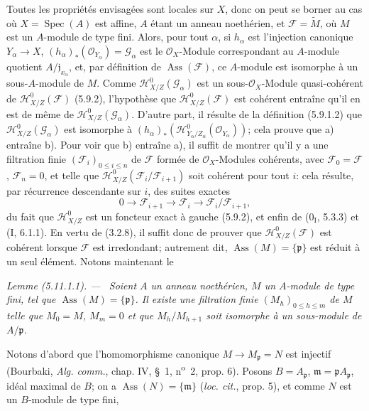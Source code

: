 \documentclass[10pt,oneside]{book}
\newenvironment{lemma}[1][]{%
  \par\medskip\noindent\itshape Lemme (#1). ---\ }{\par}
\begin{document}
Toutes les propriétés envisagées sont locales sur $X$, donc on peut se borner
au cas où $X=\operatorname{Spec}(A)$ est affine, $A$ étant un anneau
noethérien, et $\mathcal F=\widetilde M$, où $M$ est un $A$-module de type
fini. Alors, pour tout $\alpha$, si $h_\alpha$ est l'injection canonique
$Y_\alpha\to X$, $(h_\alpha)_*(\mathcal O_{Y_\alpha})=\mathcal G_\alpha$ est
le $\mathcal O_X$-Module correspondant au $A$-module quotient
$A/\mathfrak j_{x_\alpha}$, et, par définition de
$\operatorname{Ass}(\mathcal F)$, ce $A$-module est isomorphe à un
sous-$A$-module de $M$. Comme $\mathcal H^0_{X/Z}(\mathcal G_\alpha)$ est un
sous-$\mathcal O_X$-Module quasi-cohérent de
$\mathcal H^0_{X/Z}(\mathcal F)$ (5.9.2), l'hypothèse que
$\mathcal H^0_{X/Z}(\mathcal F)$ est cohérent entraîne qu'il en est de même de
$\mathcal H^0_{X/Z}(\mathcal G_\alpha)$. D'autre part, il résulte de la
définition (5.9.1.2) que $\mathcal H^0_{X/Z}(\mathcal G_\alpha)$ est
isomorphe à
$(h_\alpha)_*(\mathcal H^0_{Y_\alpha/Z_\alpha}(\mathcal O_{Y_\alpha}))$;
cela prouve que a) entraîne b). Pour voir que b) entraîne a), il suffit de
montrer qu'il y a une filtration finie $(\mathcal F_i)_{0\leq i\leq n}$ de
$\mathcal F$ formée de $\mathcal O_X$-Modules cohérents, avec
$\mathcal F_0=\mathcal F$, $\mathcal F_n=0$, et telle que
$\mathcal H^0_{X/Z}(\mathcal F_i/\mathcal F_{i+1})$ soit cohérent pour tout
$i$: cela résulte, par récurrence descendante sur $i$, des suites exactes
\[
0\longrightarrow\mathcal F_{i+1}\longrightarrow\mathcal F_i
\longrightarrow\mathcal F_i/\mathcal F_{i+1},
\]
du fait que $\mathcal H^0_{X/Z}$ est un foncteur exact à gauche (5.9.2), et
enfin de (0$_\mathrm I$, 5.3.3) et (I, 6.1.1). En vertu de (3.2.8), il suffit
donc de prouver que $\mathcal H^0_{X/Z}(\mathcal F)$ est cohérent lorsque
$\mathcal F$ est irredondant; autrement dit,
$\operatorname{Ass}(M)=\{\mathfrak p\}$ est réduit à un seul élément. Notons
maintenant le

\begin{lemma}[5.11.1.1]
\label{IV.2.s5.11.1.1-fr}
Soient $A$ un anneau noethérien, $M$ un $A$-module de type fini, tel que
$\operatorname{Ass}(M)=\{\mathfrak p\}$. Il existe une filtration finie
$(M_h)_{0\leq h\leq m}$ de $M$ telle que $M_0=M$, $M_m=0$ et que
$M_h/M_{h+1}$ soit isomorphe à un sous-module de $A/\mathfrak p$.
\end{lemma}

Notons d'abord que l'homomorphisme canonique $M\to M_\mathfrak p=N$ est
injectif (Bourbaki, \emph{Alg. comm.}, chap. IV, \S~1, n\textsuperscript{o}~2,
prop. 6). Posons $B=A_\mathfrak p$, $\mathfrak m=\mathfrak pA_\mathfrak p$,
idéal maximal de $B$; on a $\operatorname{Ass}(N)=\{\mathfrak m\}$
(\emph{loc. cit.}, prop. 5), et comme $N$ est un $B$-module de type fini,
\end{document}
